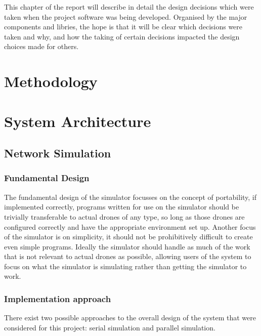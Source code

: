 This chapter of the report will describe in detail the design decisions which were taken when the project software was being developed. Organised by the major components and libries, the hope is that it will be clear which decisions were taken and why, and how the taking of certain decisions impacted the design choices made for others.

\section{Methodology}

\section{System Architecture}

	\subsection{Network Simulation}

		\subsubsection{Fundamental Design}
			The fundamental design of the simulator focusses on the concept of portability, if implemented correctly, programs written for use on the
			simulator should be trivially transferable to actual drones of any type, so long as those drones are configured correctly and have the
			appropriate environment set up. Another focus of the simulator is on simplicity, it should not be prohibitively difficult to create even
			simple programs. Ideally the simulator should handle as much of the work that is not relevant to actual drones as possible, allowing
			users of the system to focus on what the simulator is simulating rather than getting the simulator to work.

		\subsubsection{Implementation approach}
			There exist two possible approaches to the overall design of the system that were considered for this project: serial simulation
			and parallel simulation.

